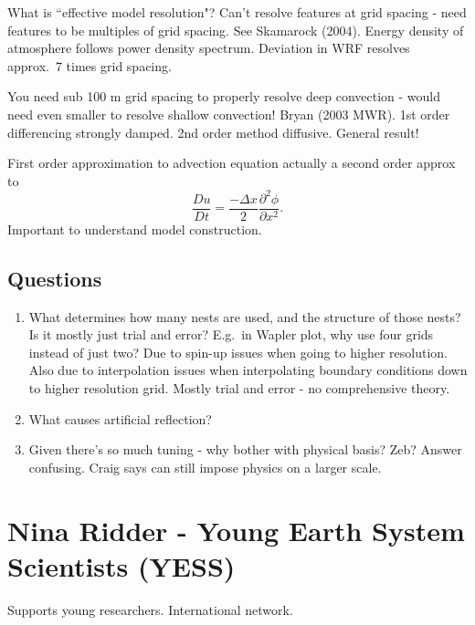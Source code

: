 \documentclass[12pt]{article}
\begin{document}
What is ``effective model resolution"? Can't resolve features at grid spacing - need features to be multiples of grid spacing. See Skamarock (2004). Energy density of atmosphere follows power density spectrum. Deviation in WRF resolves approx.~7 times grid spacing. 

You need sub 100 m grid spacing to properly resolve deep convection - would need even smaller to resolve shallow convection! Bryan (2003 MWR). 1st order differencing strongly damped. 2nd order method diffusive. General result!

First order approximation to advection equation actually a second order approx to 
$$\frac{D u}{Dt} = \frac{-\Delta x}{2} \frac{\partial^2 \phi}{\partial x^2}.$$
Important to understand model construction.

\subsection{Questions}
\begin{enumerate}
\item
What determines how many nests are used, and the structure of those nests? Is it mostly just trial and error? E.g.~in Wapler plot, why use four grids instead of just two? Due to spin-up issues when going to higher resolution. Also due to interpolation issues when interpolating boundary conditions down to higher resolution grid. Mostly trial and error - no comprehensive theory. 
\item
What causes artificial reflection?
\item
Given there's so much tuning - why bother with physical basis? Zeb? Answer confusing. Craig says can still impose physics on a larger scale. 
\end{enumerate}

\section{Nina Ridder - Young Earth System Scientists (YESS)}
Supports young researchers. International network.



\end{document}
